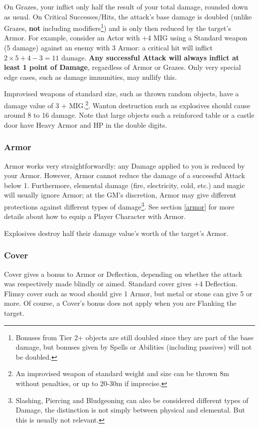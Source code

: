 On Grazes, your inflict only half the result of your total damage, rounded down as usual. On Critical Successes/Hits, the attack's base damage is doubled (unlike Grazes, \textbf{not} including modifiers\footnote{Bonuses from Tier 2+ objects are still doubled since they are part of the base damage, but bonuses given by Spells or Abilities (including passives) will not be doubled.}) and is only then reduced by the target's Armor. For example, consider an Actor with +4 MIG using a Standard weapon (5 damage) against an enemy with 3 Armor: a critical hit will inflict $2\times5+4-3 = 11$ damage. \textbf{Any successful Attack will always inflict at least 1 point of Damage}, regardless of Armor or Grazes. Only very special edge cases, such as damage immunities, may nullify this.

Improvised weapons of standard size, such as thrown random objects, have a damage value of 3 + MIG.\footnote{An improvised weapon of standard weight and size can be thrown 8m without penalties, or up to 20-30m if imprecise.}. Wanton destruction such as explosives should cause around 8 to 16 damage. Note that large objects such a reinforced table or a castle door have Heavy Armor and HP in the double digits.



\subsubsection{Armor} 

Armor works very straightforwardly: any Damage applied to you is reduced by your Armor. However, Armor cannot reduce the damage of a successful Attack below 1. Furthermore, elemental damage (fire, electricity, cold, etc.) and magic will usually ignore Armor; at the GM's discretion, Armor may give different protections against different types of damage\footnote{Slashing, Piercing and Bludgeoning can also be considered different types of Damage, the distinction is not simply between physical and elemental. But this is usually not relevant.}. See section \ref{armor} for more details about how to equip a Player Character with Armor.

Explosives destroy half their damage value's worth of the target's Armor.

\subsubsection{Cover} 

Cover gives a bonus to Armor or Deflection, depending on whether the attack was respectively made blindly or aimed. Standard cover gives +4 Deflection. Flimsy cover such as wood should give 1 Armor, but metal or stone can give 5 or more. Of course, a Cover's bonus does not apply when you are Flanking the target.

